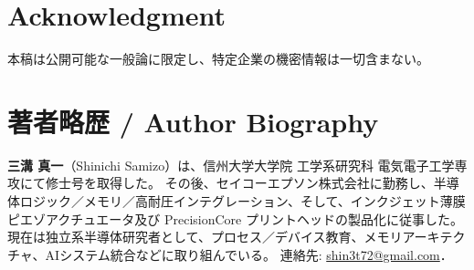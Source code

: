 \documentclass[conference]{IEEEtran}
\begin{document}
\begin{CJK}{UTF8}{min}
\section*{Acknowledgment}
本稿は公開可能な一般論に限定し、特定企業の機密情報は一切含まない。




\section*{著者略歴 / Author Biography}
\noindent\textbf{三溝 真一}（Shinichi Samizo）は、信州大学大学院 工学系研究科 電気電子工学専攻にて修士号を取得した。  
その後、セイコーエプソン株式会社に勤務し、半導体ロジック／メモリ／高耐圧インテグレーション、そして、インクジェット薄膜ピエゾアクチュエータ及び PrecisionCore プリントヘッドの製品化に従事した。  
現在は独立系半導体研究者として、プロセス／デバイス教育、メモリアーキテクチャ、AIシステム統合などに取り組んでいる。  
連絡先: \href{mailto:shin3t72@gmail.com}{shin3t72@gmail.com}．

\end{CJK} %
\end{document}

